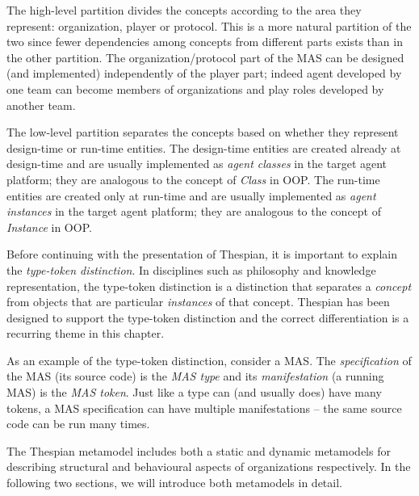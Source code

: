 The high-level partition divides the concepts according to the area they represent: organization, player or protocol.
This is a more natural partition of the two since fewer dependencies among concepts from different parts exists than in the other partition.
The organization/protocol part of the MAS can be designed (and implemented) independently of the player part; indeed agent developed by one team can become members of organizations and play roles developed by another team. 

The low-level partition separates the concepts based on whether they represent design-time or run-time entities.
The design-time entities are created already at design-time and are usually implemented as \textit{agent classes} in the target agent platform; they are analogous to the concept of \textit{Class} in OOP.
The run-time entities are created only at run-time and are usually implemented as \textit{agent instances} in the target agent platform; they are analogous to the concept of \textit{Instance} in OOP.

Before continuing with the presentation of Thespian, it is important to explain the \textit{type-token distinction}.
In disciplines such as philosophy and knowledge representation, the type-token distinction is a distinction that separates a \textit{concept} from objects that are particular \textit{instances} of that concept.
Thespian has been designed to support the type-token distinction and the correct differentiation is a recurring theme in this chapter.

As an example of the type-token distinction, consider a MAS.
The \textit{specification} of the MAS (its source code) is the \textit{MAS type} and its \textit{manifestation} (a running MAS) is the \textit{MAS token}.
Just like a type can (and usually does) have many tokens, a MAS specification can have multiple manifestations -- the same source code can be run many times.

The Thespian metamodel includes both a static and dynamic metamodels for describing structural and behavioural aspects of organizations respectively.
In the following two sections, we will introduce both metamodels in detail.



